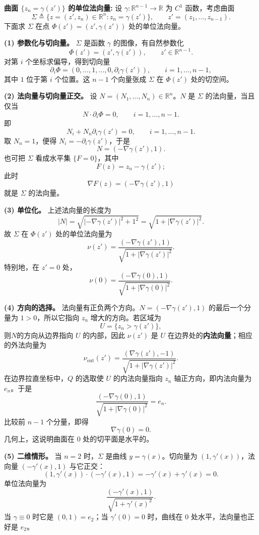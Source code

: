 \documentclass[../../main.tex]{subfiles}
\begin{document}
\begin{remark}
\textbf{曲面 $\{z_n=\gamma(z')\}$ 的单位法向量:}\label{曲面的单位法向量选取}
设 $\gamma:\mathbb{R}^{n-1}\to\mathbb{R}$ 为 $C^1$ 函数，考虑曲面
\[
\Sigma\triangleq\{z=(z',z_n)\in\mathbb{R}^n:z_n=\gamma(z')\},
\qquad z'=(z_1,\dots,z_{n-1}).
\]
下面求 $\Sigma$ 在点 $\Phi(z')=(z',\gamma(z'))$ 处的单位法向量。

\noindent\textbf{(1) 参数化与切向量。}
$\Sigma$ 是函数 $\gamma$ 的图像，有自然参数化
\[
\Phi(z')=(z',\gamma(z')),\qquad z'\in\mathbb{R}^{n-1}.
\]
对第 $i$ 个坐标求偏导，得到切向量
\[
\partial_i\Phi
=(0,\dots,1,\dots,0,\partial_i\gamma(z')),
\qquad i=1,\dots,n-1,
\]
其中 $1$ 位于第 $i$ 个位置。这 $n-1$ 个向量张成 $\Sigma$ 在 $\Phi(z')$ 处的切空间。

\noindent\textbf{(2) 法向量与切向量正交。}
设 $N=(N_1,\dots,N_n)\in\mathbb{R}^n$。$N$ 是 $\Sigma$ 的法向量，当且仅当
\[
N\cdot\partial_i\Phi=0,\qquad i=1,\dots,n-1.
\]
即
\[
N_i+N_n\partial_i\gamma(z')=0,\qquad i=1,\dots,n-1.
\]
取 $N_n=1$，便得 $N_i=-\partial_i\gamma(z')$，于是
\[
N=(-\nabla\gamma(z'),1).
\]
也可把 $\Sigma$ 看成水平集 $\{F=0\}$，其中
\[
F(z)=z_n-\gamma(z');
\]
此时
\[
\nabla F(z)=(-\nabla\gamma(z'),1)
\]
就是 $\Sigma$ 的法向量。

\noindent\textbf{(3) 单位化。}
上述法向量的长度为
\[
|N|
=\sqrt{|-\nabla\gamma(z')|^2+1^2}
=\sqrt{1+|\nabla\gamma(z')|^2}.
\]
故 $\Sigma$ 在 $\Phi(z')$ 处的单位法向量为
\[
\nu(z')
=\frac{(-\nabla\gamma(z'),1)}{\sqrt{1+|\nabla\gamma(z')|^2}}.
\]
特别地，在 $z'=0$ 处，
\[
\nu(0)
=\frac{(-\nabla\gamma(0),1)}{\sqrt{1+|\nabla\gamma(0)|^2}}.
\]

\noindent\textbf{(4) 方向的选择。}
法向量有正负两个方向。$N=(-\nabla\gamma(z'),1)$ 的最后一个分量为 $1>0$，所以它指向 $z_n$ 增大的方向。若区域为
\[
U=\{z_n>\gamma(z')\},
\]
则$N$的方向从边界指向 $U$ 的内部，因此 $\nu(z')$ 是 $U$ 在边界处的\textbf{内法向量}；相应的外法向量为
\[
\nu_{\mathrm{out}}(z')
=\frac{(\nabla\gamma(z'),-1)}{\sqrt{1+|\nabla\gamma(z')|^2}}.
\]
在边界拉直坐标中，$Q$ 的选取使 $U$ 的内法向量指向 $z_n$ 轴正方向，即内法向量为 $e_n$。于是
\[
\frac{(-\nabla\gamma(0),1)}{\sqrt{1+|\nabla\gamma(0)|^2}}=e_n.
\]
比较前 $n-1$ 个分量，即得
\[
\nabla\gamma(0)=0.
\]
几何上，这说明曲面在 $0$ 处的切平面是水平的。

\noindent\textbf{(5) 二维情形。}
当 $n=2$ 时，$\Sigma$ 是曲线 $y=\gamma(x)$。切向量为 $(1,\gamma'(x))$，法向量 $(-\gamma'(x),1)$ 与它正交：
\[
(1,\gamma'(x))\cdot(-\gamma'(x),1)
=-\gamma'(x)+\gamma'(x)=0.
\]
单位法向量为
\[
\frac{(-\gamma'(x),1)}{\sqrt{1+\gamma'(x)^2}}.
\]
当 $\gamma\equiv0$ 时它是 $(0,1)=e_2$；当 $\gamma'(0)=0$ 时，曲线在 $0$ 处水平，法向量也正好是 $e_2$。
\end{remark}
\end{document}
